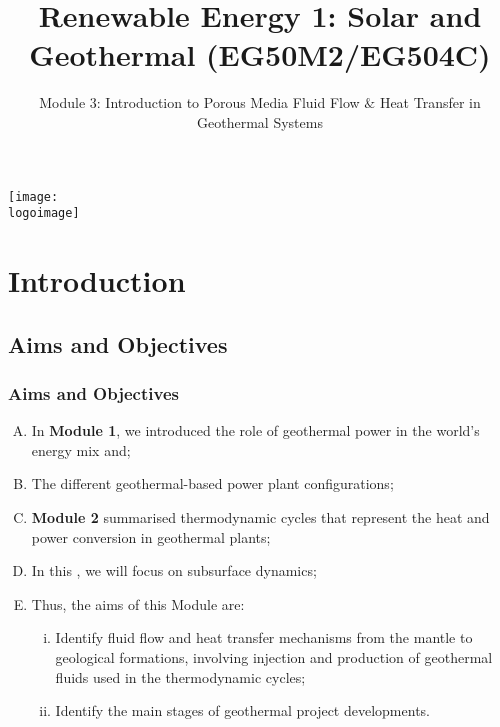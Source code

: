 \documentclass[10pt,compress,unknownkeysallowed]{beamer}
\institute{School of Engineering}
\title{Renewable Energy 1: Solar and Geothermal (EG50M2/EG504C)}
\subtitle{Module 3: Introduction to Porous Media Fluid Flow $\&$ Heat Transfer in Geothermal Systems}
\date[ ]{ }
\newcommand{\logoimage}{../FigBanner/UoAHorizBanner}
\begin{document}
\begin{frame}
  \titlepage
  \vfill%
  \begin{center}
    \texttt{[image: \\logoimage]}
  \end{center}
\end{frame}





\section{Introduction}

 \subsection{Aims and Objectives}
   \begin{frame}
     \frametitle{Aims and Objectives} 
     \begin{enumerate}[A.]%
       \item <1-> In {\bf Module 1}, we introduced the role of geothermal power in the world's energy mix and;
       \item <2-> The different geothermal-based power plant configurations;
       \item <3-> {\bf Module 2} summarised thermodynamic cycles that represent the heat and power conversion in geothermal plants;
       \item <4-> In this , we will focus on subsurface dynamics;
       \item <5-> Thus, the aims of this Module are:
          \begin{enumerate}[i)]%
               \item <6-> Identify fluid flow and heat transfer mechanisms from the mantle to geological formations, involving injection and production of geothermal fluids used in the thermodynamic cycles;
               \item <7-> Identify the main stages of geothermal project developments.
          \end{enumerate} 
 \end{enumerate}
   \end{frame}
\end{document}
